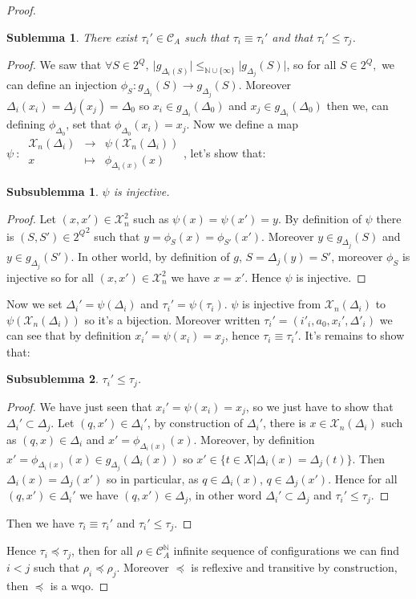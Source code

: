 \documentclass[a4paper,10pt]{report}
\newtheorem{slm}{Sublemma}[lm]
\newtheorem{sslm}{Subsublemma}[slm]
\newcommand{\dmap}[5]{
#1~:~\begin{array}{ccccc}
#2 &\to& #3 \\
#4  &\mapsto& #5
\end{array}}
\newcommand{\C}{\mathcal{C}_{A}}
\newcommand{\X}{\mathcal{X}_{n}}
\begin{document}
\begin {proof}
\begin{slm}
  There exist $\tau_i' \in \C$ such that $\tau_i \equiv \tau_i'$ and that  $\tau_i' \leq \tau_j$.
\end{slm}
\begin{proof}
We saw that $\forall S \in 2^Q,\ \lvert g_{\Delta_i(S)} \lvert \leq_{\mathbb N \cup \{\infty\}} \lvert g_{\Delta_j}(S) \lvert$, 
so for all $S \in 2^Q,$ we can define an injection $\phi_S: g_{\Delta_i}(S) \to g_{\Delta_j}(S)$. 
Moreover $\Delta_i(x_i)=\Delta_j(x_j)=\Delta_0$ so $x_i \in g_{\Delta_i}(\Delta_0)$ and $x_j \in g_{\Delta_i}(\Delta_0) $ then we, can defining $\phi_{\Delta_0}$, set that $\phi_{\Delta_0}(x_i)=x_j$.
Now we define a map $\dmap{\psi}{\X(\Delta_i)}{\psi(\X(\Delta_i))}{x}{\phi_{\Delta_i(x)}(x)}$, let's show that:
\begin{sslm}
  $\psi$ is injective.
\end{sslm}
\begin{proof}
Let $(x,x') \in \X^2$ such as $\psi(x)=\psi(x')=y$.
By definition of $\psi$ there is $(S,S')\in {2^Q}^2$ such that  $y=\phi_S(x)=\phi_{S'}(x')$. Moreover $y\in g_{\Delta_j}(S)$ and  $y\in g_{\Delta_j}(S')$. In other world, by definition of $g$,
$S=\Delta_j(y)=S'$, moreover $\phi_S$ is injective so for all $(x,x') \in \X^2 $ we have $ x=x'$.
Hence $\psi$ is injective.
\end{proof}
Now we set $\Delta_i'=\psi (\Delta_i)$ and $\tau_i'=\psi (\tau_i)$. 
$\psi$ is injective from $\X(\Delta_i)$ to $\psi(\X(\Delta_i))$ so it's a bijection.
Moreover written $ \tau_i'=(i'_i,a_0,x_i',\Delta'_i)$ we can see that by definition $ x_i'=\psi(x_i)=x_j$, hence $\tau_i \equiv \tau_i'$.
It's remains to show that:
\begin{sslm}
  $\tau_i' \leq \tau_j$.
\end{sslm}

\begin{proof}
  We have just seen that $ x_i'=\psi(x_i)=x_j$, so we just have to show that $\Delta_i' \subset \Delta_j$.
  Let $(q,x') \in \Delta_i'$, by construction of $\Delta_i'$, there is $x \in \X(\Delta_i)$ such as $(q,x) \in \Delta_i$ and $x'=\phi_{\Delta_i(x)}(x)$.
  Moreover, by definition $x'=\phi_{\Delta_i(x)}(x) \in g_{\Delta_j}(\Delta_i(x))$ so $ x' \in \{ t \in X | \Delta_i(x)=\Delta_j(t) \}$.
  Then $\Delta_i(x)=\Delta_j(x')$ so in particular, as $q \in \Delta_i(x)$, $q \in \Delta_j(x')$.
  Hence for all $(q,x') \in \Delta_i'$ we have $(q,x') \in \Delta_j$, in other word $\Delta_i' \subset \Delta_j$ and $\tau_i' \leq \tau_j$.
\end{proof}
Then we have $\tau_i \equiv \tau_i'$ and  $\tau_i' \leq \tau_j$.
\end{proof}	
Hence $\tau_i \preceq \tau_j$, then for all $\rho \in \C^{\mathbb N}$ infinite sequence of configurations we can find $i < j$ such that $\rho_i \preceq \rho_j$.
Moreover $\preceq$ is reflexive and transitive by construction, then $\preceq$ is a wqo.

\end{proof}
\end{document}
